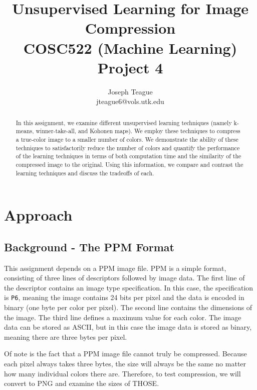 \documentclass[letter,11pt,titlepage]{article}
\begin{document}
\title{Unsupervised Learning for Image Compression\\ \small{COSC522 (Machine Learning) Project 4}}
\author{Joseph Teague\\ \small{jteague6@vols.utk.edu}}
\maketitle

\begin{abstract}

    In this assignment, we examine different unsupervised learning techniques (namely k-means, winner-take-all, and Kohonen maps). We employ these techniques to compress a true-color image to a smaller number of colors. We demonstrate the ability of these techniques to satisfactorily reduce the number of colors and quantify the performance of the learning techniques in terms of both computation time and the similarity of the compressed image to the original. Using this information, we compare and contrast the learning techniques and discuss the tradeoffs of each.

\end{abstract}

\section{Approach}

\subsection{Background - The PPM Format}
This assignment depends on a PPM image file. PPM is a simple format, consisting of three lines of descriptors followed by image data\cite{PPMinfo}. The first line of the descriptor contains an image type specification. In this case, the specification is \texttt{P6}, meaning the image contains 24 bits per pixel and the data is encoded in binary (one byte per color per pixel). The second line contains the dimensions of the image. The third line defines a maximum value for each color. The image data can be stored as ASCII, but in this case the image data is stored as binary, meaning there are three bytes per pixel.

Of note is the fact that a PPM image file cannot truly be compressed. Because each pixel always takes three bytes, the size will always be the same no matter how many individual colors there are. Therefore, to test compression, we will convert to PNG and examine the sizes of THOSE.
\end{document}
